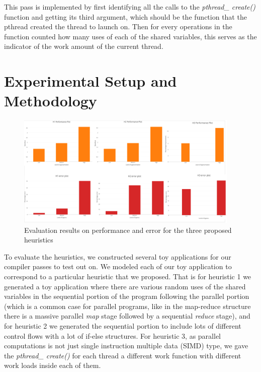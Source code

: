 \documentclass[12pt,conference]{IEEEtran}
\begin{document}
This pass is implemented by first identifying all the calls to the 
\textit{pthread\_ create()} function and getting its third argument, which should
be the function that the pthread created the thread to launch on. Then for every
operations in the function counted how many uses of each of the shared 
variables, this serves as the indicator of the work amount of the current thread.



\section{Experimental Setup and Methodology}

\begin{figure}[h]
    \centering
    \includegraphics[width=0.95\textwidth]{result.png}
    \caption{Evaluation results on performance and error for the three proposed heuristics}
    \label{fig:result}
\end{figure}

To evaluate the heuristics, we constructed several toy applications for our compiler 
passes to test out on. We modeled each of our toy application to correspond to a
particular heuristic that we proposed. That is for heuristic 1 we generated a toy
application where there are various random uses of the shared variables in the
sequential portion of the program following the parallel portion (which is a
common case for parallel programs, like in the map-reduce structure there is
a massive parallel \emph{map} stage followed by a sequential \emph{reduce} stage),
and for heuristic 2 we generated the sequential portion to include lots of different
control flows with a lot of if-else structures. For heuristic 3, as parallel
computations is not just single instruction multiple data (SIMD) type, we gave 
the \textit{pthread\_ create()} for each thread a different work function
with different work loads inside each of them.
\end{document}
